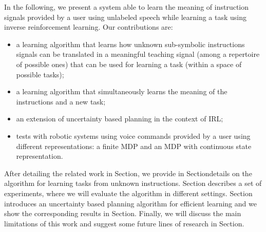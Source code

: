 In the following, we present a system able to learn the meaning of instruction signals provided by a user using unlabeled speech while learning a task using inverse reinforcement learning. Our contributions are:
\begin{itemize}
    \item a learning algorithm that learns how unknown sub-symbolic instructions signals can be translated in a meaningful teaching signal (among a repertoire of possible ones) that can be used for learning a task (within a space of possible tasks);
    \item a learning algorithm that simultaneously learns the meaning of the instructions and a new task;
    \item an extension of uncertainty based planning in the context of IRL;
    \item tests with robotic systems using voice commands provided by a user using different representations: a finite MDP and an MDP with continuous state representation.
\end{itemize}

After detailing the related work in Section, we provide in Sectiondetails on the algorithm for learning tasks from unknown instructions. Section describes a set of experiments, where we will evaluate the algorithm in different settings. Section introduces an uncertainty based planning algorithm for efficient learning and we show the corresponding results in Section. Finally, we will discuss the main limitations of this work and suggest some future lines of research in Section. 


